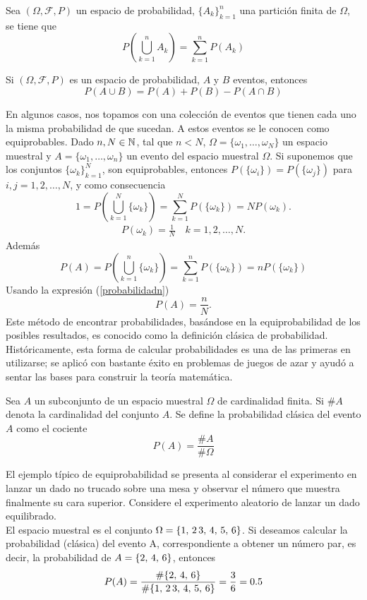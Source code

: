 \begin{Prop}
    Sea $(\Omega,\mathscr{F},P)$ un espacio de probabilidad, $\{A_k\}_{k=1}^n$ una partición finita de $\Omega$, se tiene que
    $$P(\bigcup_{k=1}^n A_k)=\sum_{k=1}^n P(A_k)$$ 
\end{Prop}
\begin{Cor}
    Si $(\Omega,\mathscr{F},P)$ es un espacio de probabilidad, $A$ y $B$ eventos, entonces
    $$P(A\cup B)=P(A)+P(B)-P(A\cap B)$$
\end{Cor}
En algunos casos, nos topamos con una colección de eventos que tienen cada uno la misma probabilidad de que sucedan. A estos eventos se le conocen como equiprobables.
Dado $n,N\in{\mathbb{N}}$, tal que $n<N$, $\Omega=\{\omega_1,\ldots,\omega_N\}$ un espacio muestral y $A=\{\omega_1,\ldots,\omega_n\}$ un evento del espacio muestral $\Omega$.
Si suponemos que los conjuntos  $\{\omega_k\}_{k=1}^N$, son equiprobables, entonces $P(\{\omega_i\})=P(\{\omega_j\})$ para $i,j=1,2,\ldots,N$, y como consecuencia $$1=P(\bigcup_{k=1}^N \{\omega_k\})=\sum_{k=1}^N P(\{\omega_k\})=N P(\omega_k).$$
\begin{eqnarray}
    \label{probabilidadn}
    P(\omega_k)=\frac{1}{N}\quad k=1,2,\ldots ,N.
\end{eqnarray}
Además
$$P(A)=P(\bigcup_{k=1}^n \{\omega_k\})=\sum_{k=1}^n P(\{\omega_k\})=n P(\{\omega_k\})$$
Usando la expresión (\ref{probabilidadn})
$$P(A)=\frac{n}{N}.$$
Este método de encontrar probabilidades, basándose en la equiprobabilidad de los posibles resultados, es conocido como la definición clásica de probabilidad.\\
Históricamente, esta forma de calcular probabilidades es una de las primeras en utilizarse; se aplicó con bastante éxito en problemas de juegos de azar y ayudó a sentar las bases para construir la teoría matemática.
\begin{Def}
    Sea $A$ un subconjunto de un espacio muestral $\Omega$ de cardinalidad finita. Si $\#A$ denota la cardinalidad del conjunto $A$. Se define la probabilidad clásica del evento $A$ como el cociente $$P(A)=\frac{\#A}{\#\Omega}$$
    \label{defprobClásica}
\end{Def}
\begin{Ejm}
    El ejemplo típico de equiprobabilidad se presenta al considerar el experimento  en lanzar un dado no trucado sobre una mesa y observar el número que muestra finalmente su cara superior. Considere el experimento aleatorio de lanzar un dado equilibrado.\\ El espacio muestral es el conjunto  $\Omega=\{1,\thinspace 2\thinspace 3,\thinspace 4,\thinspace 5,\thinspace 6\}$. Si deseamos calcular la probabilidad (clásica) del evento A, correspondiente a obtener un número par, es decir, la probabilidad de $A=\{2,\thinspace 4,\thinspace 6\}$, entonces $$P(A)=\frac{\#\{2,\thinspace 4,\thinspace 6\}}{\#\{1,\thinspace 2\thinspace 3,\thinspace 4,\thinspace 5,\thinspace 6\}}=\frac{3}{6}=0.5$$
\end{Ejm}
